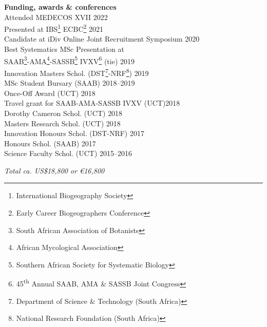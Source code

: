\documentclass[10pt]{article}
\begin{document}
\begin{multicols}{2}

\textbf{Funding, awards \& conferences}\\ %

Attended MEDECOS XVII                              \hfill {\small       2022} \\
Presented at IBS\footnote{International Biogeography
  Society} ECBC\footnote{Early Career
  Biogeographers Conference}                       \hfill {\small       2021} \\
Candidate at iDiv Online Joint
  Recruitment Symposium                            \hfill {\small       2020} \\
Best Systematics MSc Presentation at \\
\hspace{2em} SAAB\footnote{South African
  Association of Botanists}-AMA\footnote{African
  Mycological Association}-SASSB\footnote{Southern
  African Society for Systematic Biology}
  IVXV\footnote{45\textsuperscript{th} Annual SAAB,
  AMA \& SASSB Joint Congress} (tie)               \hfill {\small       2019} \\
Innovation Masters Schol. {\small (DST\footnote{
  Department of Science \& Technology (South
  Africa)}-NRF\footnote{National Research
  Foundation (South Africa)})}                     \hfill {\small       2019} \\
MSc Student Bursary {\small (SAAB)}                \hfill {\small 2018--2019} \\
Once-Off Award {\small (UCT)}                      \hfill {\small       2018} \\
Travel grant for SAAB-AMA-SASSB IVXV {\small (UCT)}\hfill {\small       2018} \\
Dorothy Cameron Schol. {\small (UCT)}              \hfill {\small       2018} \\
Masters Research Schol. {\small (UCT)}             \hfill {\small       2018} \\
Innovation Honours Schol. {\small (DST-NRF)}       \hfill {\small       2017} \\
Honours Schol. {\small (SAAB)}                     \hfill {\small       2017} \\
Science Faculty Schol. {\small (UCT)}              \hfill {\small 2015--2016}

\begin{center}
  \textit{Total ca. US\$18,800 or €16,800}
\end{center}


\end{multicols}
\end{document}
